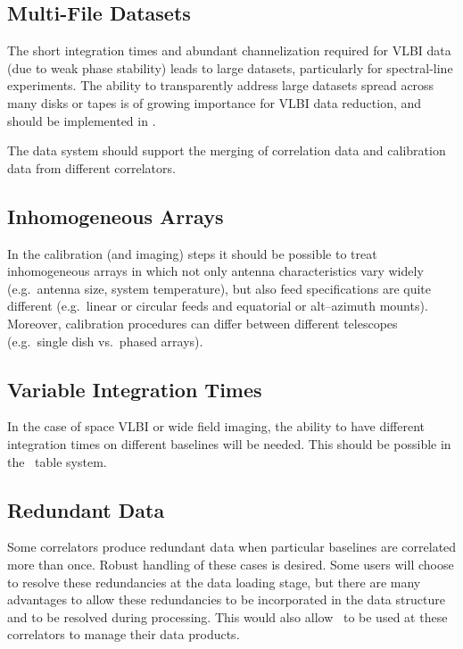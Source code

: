 \subsection{Multi-File Datasets}

The short integration times and abundant channelization required for
VLBI data (due to weak phase stability) leads to large datasets,
particularly for spectral-line experiments. The ability to
transparently address large datasets spread across many disks or tapes
is of growing importance for VLBI data reduction, and should be
implemented in \aipspp.

The data system should support the merging of correlation data and
calibration data from different correlators.

\subsection{Inhomogeneous Arrays}

In the calibration (and imaging) steps it should be possible to treat
inhomogeneous arrays in which not only antenna characteristics vary
widely (e.g.\ antenna size, system temperature), but also feed
specifications are quite different (e.g.\ linear or circular feeds and
equatorial or alt--azimuth mounts). Moreover, calibration procedures
can differ between different telescopes (e.g.\ single dish vs.\ phased
arrays).

\subsection{Variable Integration Times}

In the case of space VLBI or wide field imaging, the ability to have
different integration times on different baselines will be needed.
This should be possible in the \aipspp\ table system.

\subsection{Redundant Data}
\label{redata}

Some correlators produce redundant data when particular baselines are
correlated more than once. Robust handling of these cases is desired.
Some users will choose to resolve these redundancies at the data
loading stage, but there are many advantages to allow these
redundancies to be incorporated in the data structure and to be
resolved during processing. This would also allow \aipspp\ to be used
at these correlators to manage their data products.


